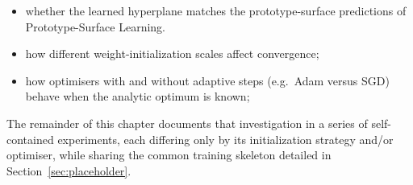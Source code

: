 \begin{itemize}

\item whether the learned hyperplane matches the prototype-surface predictions of Prototype-Surface Learning.

\item how different weight-initialization scales affect convergence;

\item how optimisers with and without adaptive steps (e.g.\ Adam versus SGD) behave when the analytic optimum is known;

\end{itemize}

The remainder of this chapter documents that investigation in a series of self-contained experiments, each differing only by its initialization strategy and/or optimiser, while sharing the common training skeleton detailed in Section~\ref{sec:placeholder}.
